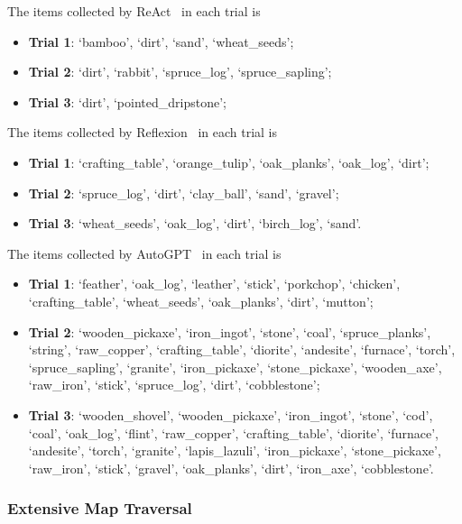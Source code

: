 The items collected by ReAct~\cite{yao2022react} in each trial is \begin{itemize}
    \item \textbf{Trial 1}: {`bamboo', `dirt', `sand', `wheat\_seeds'};
    \item \textbf{Trial 2}: {`dirt', `rabbit', `spruce\_log', `spruce\_sapling'};
    \item \textbf{Trial 3}: {`dirt', `pointed\_dripstone'};
\end{itemize}
The items collected by Reflexion~\cite{shinn2023reflexion} in each trial is \begin{itemize}
    \item \textbf{Trial 1}: {`crafting\_table', `orange\_tulip', `oak\_planks', `oak\_log', `dirt'};
    \item \textbf{Trial 2}: {`spruce\_log', `dirt', `clay\_ball', `sand', `gravel'};
    \item \textbf{Trial 3}: {`wheat\_seeds', `oak\_log', `dirt', `birch\_log', `sand'}.
\end{itemize}
The items collected by AutoGPT~\cite{autogpt} in each trial is \begin{itemize}
    \item \textbf{Trial 1}: {`feather', `oak\_log', `leather', `stick', `porkchop', `chicken', `crafting\_table', `wheat\_seeds', `oak\_planks', `dirt', `mutton'};
    \item \textbf{Trial 2}: {`wooden\_pickaxe', `iron\_ingot', `stone', `coal', `spruce\_planks', `string', `raw\_copper', `crafting\_table', `diorite', `andesite', `furnace', `torch', `spruce\_sapling', `granite', `iron\_pickaxe', `stone\_pickaxe', `wooden\_axe', `raw\_iron', `stick', `spruce\_log', `dirt', `cobblestone'};
    \item \textbf{Trial 3}: {`wooden\_shovel', `wooden\_pickaxe', `iron\_ingot', `stone', `cod', `coal', `oak\_log', `flint', `raw\_copper', `crafting\_table', `diorite', `furnace', `andesite', `torch', `granite', `lapis\_lazuli', `iron\_pickaxe', `stone\_pickaxe', `raw\_iron', `stick', `gravel', `oak\_planks', `dirt', `iron\_axe', `cobblestone'}.
\end{itemize}

\subsubsection{Extensive Map Traversal}



